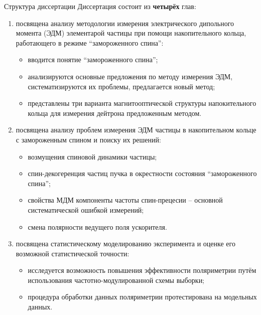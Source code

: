\documentclass[14pt]{beamer}
\begin{document}
\begin{frame}{Структура диссертации}
	Диссертация состоит из \textbf{четырёх} глав:
	\begin{enumerate}
		\item посвящена анализу методологии измерения электрического дипольного момента (ЭДМ) 
		элементарой частицы при помощи накопительного кольца, работающего в режиме ``замороженного спина'': 
		\begin{itemize}
			\item вводится понятие ``замороженного спина'';
			\item анализируются основные предложения по методу измерения ЭДМ, систематизируются их проблемы, предлагается новый метод;
			\item представлены три варианта магнитооптической структуры напокительного кольца для измерения дейтрона предложенным методом.
		\end{itemize}
	\end{enumerate}
\end{frame}
\begin{frame}
	\begin{enumerate}\setcounter{enumi}{1}
			\item посвящена анализу проблем измерения ЭДМ частицы 
			в накопительном кольце с замороженным спином и поиску их решений:
			\begin{itemize}
				\item возмущения спиновой динамики частицы;
				\item спин-декогеренция частиц пучка в окрестности состояния ``замороженного спина'';
				\item свойства МДМ компоненты частоты спин-прецесии -- основной систематической ошибкой измерений;
				\item смена полярности ведущего поля ускорителя.
			\end{itemize}
		\item посвящена статистическому моделированию эксперимента 
		и оценке его возможной статистической точности:
		\begin{itemize}
			\item исследуется возможность повышения эффективности
			поляриметрии путём использования частотно-модулированной схемы выборки;
			\item процедура обработки данных поляриметрии протестирована на модельных данных.
		\end{itemize}
	\end{enumerate}
\end{frame}
\end{document}
